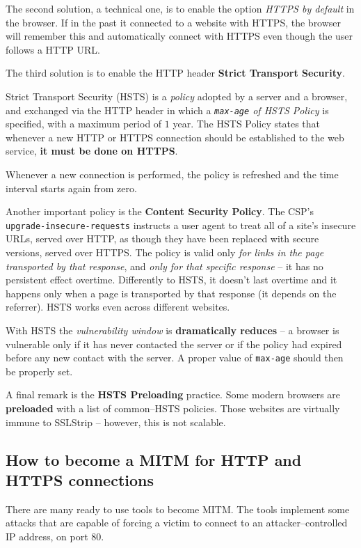 \documentclass[10pt]{extbook}
\begin{document}
The second solution, a technical one, is to enable the option \emph{HTTPS by
default} in the browser. If in the past it connected to a website with HTTPS,
the browser will remember this and automatically connect with HTTPS even though
the user follows a HTTP URL.

The third solution is to enable the HTTP header \textbf{Strict Transport
Security}.

Strict Transport Security (HSTS) is a \emph{policy} adopted by a server and a
browser, and exchanged via the HTTP header in which a \emph{\texttt{max-age} of
HSTS Policy} is specified, with a maximum period of $1$ year. The HSTS Policy
states that whenever a new HTTP or HTTPS connection should be established to the
web service, \textbf{it must be done on HTTPS}.

Whenever a new connection is performed, the policy is refreshed and the time
interval starts again from zero.

Another important policy is the \textbf{Content Security Policy}. The CSP's
\texttt{upgrade\--insecure\--requests} instructs a user agent to treat all of a
site's insecure URLs, served over HTTP, as though they have been replaced with
secure versions, served over HTTPS. The policy is valid only \emph{for links in
the page transported by that response}, and \emph{only for that specific
response} -- it has no persistent effect overtime. Differently to HSTS, it
doesn't last overtime and it happens only when a page is transported by that
response (it depends on the referrer). HSTS works even across different
websites.

With HSTS the \emph{vulnerability window} is \textbf{dramatically reduces} -- a
browser is vulnerable only if it has never contacted the server or if the
policy had expired before any new contact with the server. A proper value of
\texttt{max-age} should then be properly set.

A final remark is the \textbf{HSTS Preloading} practice. Some modern browsers
are \textbf{preloaded} with a list of common--HSTS policies. Those websites are
virtually immune to SSLStrip -- however, this is not scalable.

\subsection{How to become a MITM for HTTP and HTTPS connections}

There are many ready to use tools to become MITM. The tools implement some
attacks that are capable of forcing a victim to connect to an
attacker--controlled IP address, on port $80$.
\end{document}
